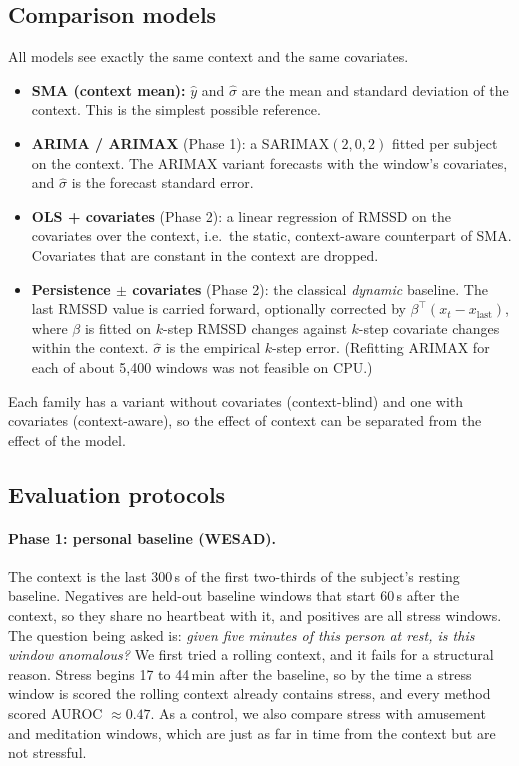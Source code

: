 \documentclass[11pt,a4paper]{article}
\begin{document}
\subsection{Comparison models}
All models see exactly the same context and the same covariates.
\begin{itemize}
  \item \textbf{SMA (context mean):} $\hat y$ and $\hat\sigma$ are the mean and standard deviation of the context. This is the simplest possible reference.
  \item \textbf{ARIMA / ARIMAX} (Phase 1): a SARIMAX$(2,0,2)$ fitted per subject on the context. The ARIMAX variant forecasts with the window's covariates, and $\hat\sigma$ is the forecast standard error.
  \item \textbf{OLS + covariates} (Phase 2): a linear regression of RMSSD on the covariates over the context, i.e.\ the static, context-aware counterpart of SMA. Covariates that are constant in the context are dropped.
  \item \textbf{Persistence $\pm$ covariates} (Phase 2): the classical \emph{dynamic} baseline. The last RMSSD value is carried forward, optionally corrected by $\beta^\top(x_t-x_{\text{last}})$, where $\beta$ is fitted on $k$-step RMSSD changes against $k$-step covariate changes within the context. $\hat\sigma$ is the empirical $k$-step error. (Refitting ARIMAX for each of about 5{,}400 windows was not feasible on CPU.)
\end{itemize}
Each family has a variant without covariates (context-blind) and one with covariates (context-aware), so the effect of context can be separated from the effect of the model.

\subsection{Evaluation protocols}\label{sec:protocol}

\paragraph{Phase 1: personal baseline (WESAD).} The context is the last 300\,s of the first two-thirds of the subject's resting baseline. Negatives are held-out baseline windows that start 60\,s after the context, so they share no heartbeat with it, and positives are all stress windows. The question being asked is: \emph{given five minutes of this person at rest, is this window anomalous?} We first tried a rolling context, and it fails for a structural reason. Stress begins 17 to 44\,min after the baseline, so by the time a stress window is scored the rolling context already contains stress, and every method scored AUROC $\approx 0.47$. As a control, we also compare stress with amusement and meditation windows, which are just as far in time from the context but are not stressful.
\end{document}
